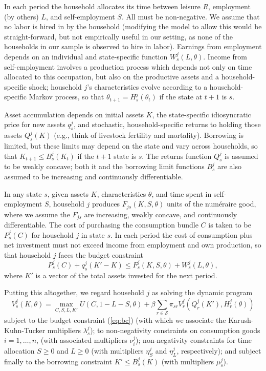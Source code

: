 \documentclass[11pt]{article}
\newcommand{\Eq}[1]{(\ref{eq:#1})}
\begin{document}
In each period the household allocates its time between leisure $R$,
employment (by others) $L$, and self-employment $S$. All must be
non-negative.  We assume that no labor is hired in by the household
(modifying the model to allow this would be straight-forward, but not
empirically useful in our setting, as none of the households in our
sample is observed to hire in labor).  Earnings from employment
depends on an individual and state-specific function
$W^j_{s}(L,\theta)$.  Income from self-employment involves a
production process which depends not only on time allocated to this
occupation, but also on the productive assets and a
household-specific shock; household \(j\)'s characteristics evolve
according to a household-specific Markov process, so that
$\theta_{t+1}=H^j_{s}(\theta_{t})$ if the state at $t+1$ is $s$.

Asset accumulation depends on initial assets $K$, the state-specific
idiosyncratic price for new assets $q^j_s$, and stochastic, household-specific
returns to holding those assets $Q^j_{s}(K)$ (e.g., think of livestock
fertility and mortality).  Borrowing is limited, but these limits may depend on the
state and vary across households, so that $K_{t+1}\leq B^j_{s}(K_t)$
if the $t+1$ state is $s$.  The
returns function $Q^j_{s}$ is assumed to be weakly concave; both it and
the borrowing limit functions $B^j_{s}$ are also assumed to be increasing
and continuously differentiable.

In any state $s$, given assets $K$, characteristics $\theta$, and time
spent in self-employment $S$, household \(j\) produces
$F_{js}(K,S,\theta)$ units of the numéraire good, where we assume the
$F_{js}$ are increasing, weakly concave, and continuously
differentiable.  The cost of purchasing the consumption bundle $C$ is
taken to be $P^j_s(C)$ for household \(j\) in state $s$.  In each
period the cost of consumption plus net investment must not exceed
income from employment and own production, so that household \(j\) faces
the budget constraint
\begin{equation} 
\label{eq:bc}
   P^j_s(C) + q^j_s(K'-K) \leq F^j_{s}(K,S,\theta) + W^j_{s}(L,\theta),
\end{equation}
where $K'$ is a vector of the total assets invested for the next
period.

Putting this altogether, we regard household \(j\) as solving the
dynamic program
\begin{equation}
\label{eq:bellman}
  V^j_{s}(K,\theta)=\max_{C,S,L,K'} U(C,1-L-S,\theta) +
  \beta\sum_{r\in\mathcal{S}}\pi_{sr}V^j_{r}\left(Q^j_{r}(K'),H^j_{r}(\theta)\right)
\end{equation}
subject to the budget constraint \Eq{bc} (with which we associate the
Karush-Kuhn-Tucker multipliers \(\lambda^j_s\)); to non-negativity
constraints on consumption goods $i=1,\dots,n$, (with associated
multipliers $\nu_i^j$); non-negativity constraints for time
allocation $S\geq 0$ and $L\geq 0$ (with multipliers $\eta^j_S$ and
$\eta^j_L$, respectively); and subject finally to the borrowing
constraint $K'\leq B^j_{s}(K)$ (with multipliers \(\mu^j_s\)).
\end{document}

